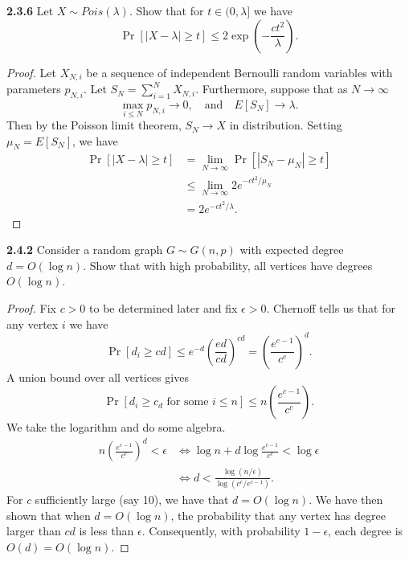 \documentclass[11pt,letterpaper]{report}
\begin{document}
\noindent\textbf{2.3.6}
Let $X\sim Pois(\lambda)$. Show that for $t\in (0, \lambda]$ we have
\[
\Pr[|X-\lambda|\geq t] \leq 2\exp\left(-\frac{ct^2}{\lambda}\right).
\]
\begin{proof}
	Let $X_{N, i}$ be a sequence of independent Bernoulli random variables with parameters $p_{N,i}$. Let $S_N = \sum_{i=1}^NX_{N,i}$. Furthermore, suppose that as $N\to \infty$
	\[
	\max_{i\leq N}p_{N,i} \to 0,\quad\text{and}\quad E[S_N]\to \lambda.
	\]
	Then by the Poisson limit theorem, $S_N\to X$ in distribution. Setting $\mu_N = E[S_N]$, we have
	\begin{align*}
		\Pr[|X-\lambda|\geq t]&= \lim_{N\to \infty}\Pr[|S_N-\mu_N|\geq t]\\
		&\leq \lim_{N\to \infty}2e^{-ct^2/\mu_N}\\
		&= 2e^{-ct^2/\lambda}.
	\end{align*}
\end{proof}










\noindent\textbf{2.4.2}
Consider a random graph $G\sim G(n, p)$ with expected degree $d = O(\log n)$. Show that with high probability, all vertices have degrees $O(\log n)$.
\begin{proof}
	Fix $c>0$ to be determined later and fix $\epsilon>0$. Chernoff tells us that for any vertex $i$ we have
	\[
	\Pr[d_i \geq cd] \leq e^{-d}\left(\frac{ed}{cd}\right)^{cd}= \left(\frac{e^{c-1}}{c^c}\right)^d.
	\]
	A union bound over all vertices gives
	\[
	\Pr[d_i\geq c_d\text{ for some }i\leq n] \leq n\left(\frac{e^{c-1}}{c^c}\right).
	\]
	We take the logarithm and do some algebra.
	\begin{align*}
		n\left(\frac{e^{c-1}}{c^c}\right)^d<\epsilon &\iff \log n + d\log\frac{e^{c-1}}{c^c}<\log \epsilon\\
		&\iff d< \frac{\log(n/\epsilon)}{\log(c^c/e^{c-1})}.
	\end{align*}
	For $c$ sufficiently large (say 10), we have that $d = O(\log n)$. We have then shown that when $d = O(\log n)$, the probability that any vertex has degree larger than $cd$ is less than $\epsilon$. Consequently, with probability $1-\epsilon$, each degree is $O(d) = O(\log n)$.
\end{proof}
\end{document}
